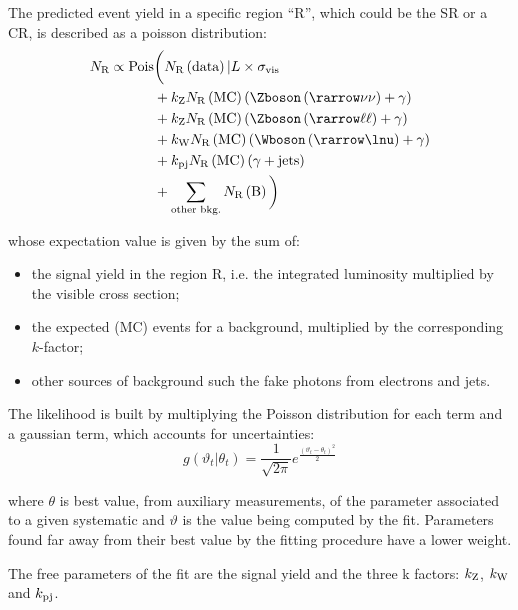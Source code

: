 The predicted event yield in a specific region ``R'', which could be the SR or a CR, is described as a poisson distribution:
\begin{equation}
\begin{split}
		N_\textup{R} \propto \text{Pois} &\bigg( N_\textup{R}\left(\text{data}\right)\vert L\times\sigma_{\textup{vis}} \\
						&+ k_{\textup{Z}} N_{\textup{R}}\left(\text{MC}\right) \left(\Zboson \left(\rarrow \nu\nu \right) +  \gamma\right) \\
						&+ k_{\textup{Z}}N_\textup{R}\left(\text{MC}\right) \left(\Zboson \left(\rarrow \ell\ell\right) + \gamma \right) \\
						&+ k_{\textup{W}}N_\textup{R}\left(\text{MC}\right) \left(\Wboson \left(\rarrow \lnu\right)+ \gamma \right) \\
					 	&+ k_{\textup{pj}}N_{\textup{R}}\left(\text{MC}\right) \left(\gamma + \text{jets} \right)\\  
					 	&+ \sum_{\textup{other bkg.}} N_{\textup{R}}\left(\text{B}\right) \bigg)
\end{split}
\label{eqn:nr}
\end{equation}

whose expectation value is given by the sum of:
\begin{itemize}
\item the signal yield in the region R, i.e. the integrated luminosity multiplied by the visible cross section;
\item the expected (MC) events for a background, multiplied by the corresponding $k$-factor;
\item other sources of background such the fake photons from electrons and jets.
\end{itemize}

The likelihood is built by multiplying the Poisson distribution for each term and a gaussian term, which accounts for uncertainties:
\begin{equation}
   g(\vartheta_{t} \vert \theta_{t}) = \frac{1}{\sqrt{2\pi}}e^{\frac{(\vartheta_{t}-\theta_{t})^2}{2} } 
   \label{eqn:gauss}
\end{equation} 

where $\theta$ is best value, from auxiliary measurements, of the parameter associated to a given systematic and $\vartheta$ is the value being computed by the fit. Parameters found far away from their best value by the fitting procedure have a lower weight.

The free parameters of the fit are the signal yield and the three k factors: $k_{\textup{Z}}$, $k_{\textup{W}}$ and $k_{\textup{pj}}$.

